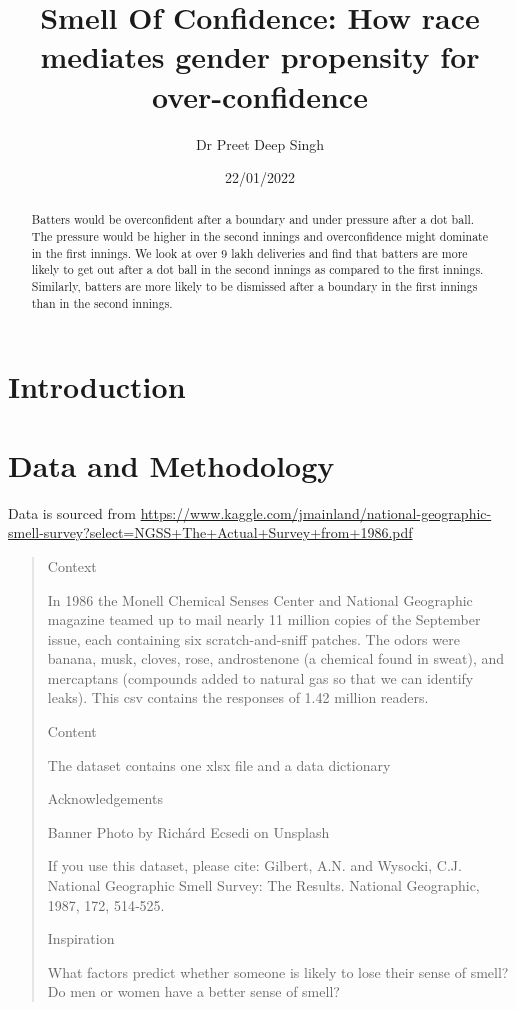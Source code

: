 \documentclass[
]{article}
\title{Smell Of Confidence: How race mediates gender propensity for over-confidence}
\author{Dr Preet Deep Singh}
\date{22/01/2022}
\begin{document}
\maketitle
\begin{abstract}
Batters would be overconfident after a boundary and under pressure after a dot ball. The pressure would be higher in the second innings and overconfidence might dominate in the first innings. We look at over 9 lakh deliveries and find that batters are more likely to get out after a dot ball in the second innings as compared to the first innings. Similarly, batters are more likely to be dismissed after a boundary in the first innings than in the second innings.
\end{abstract}

\section{Introduction}

\section{Data and Methodology}

Data is sourced from \url{https://www.kaggle.com/jmainland/national-geographic-smell-survey?select=NGSS+The+Actual+Survey+from+1986.pdf}

\begin{quote}
Context

In 1986 the Monell Chemical Senses Center and National Geographic magazine teamed up to mail nearly 11 million copies of the September issue, each containing six scratch-and-sniff patches. The odors were banana, musk, cloves, rose, androstenone (a chemical found in sweat), and mercaptans (compounds added to natural gas so that we can identify leaks). This csv contains the responses of 1.42 million readers.

Content

The dataset contains one xlsx file and a data dictionary

Acknowledgements

Banner Photo by Richárd Ecsedi on Unsplash

If you use this dataset, please cite:
Gilbert, A.N. and Wysocki, C.J. National Geographic Smell Survey: The Results. National Geographic, 1987, 172, 514‑525.

Inspiration

What factors predict whether someone is likely to lose their sense of smell?
Do men or women have a better sense of smell?
\end{quote}
\end{document}
